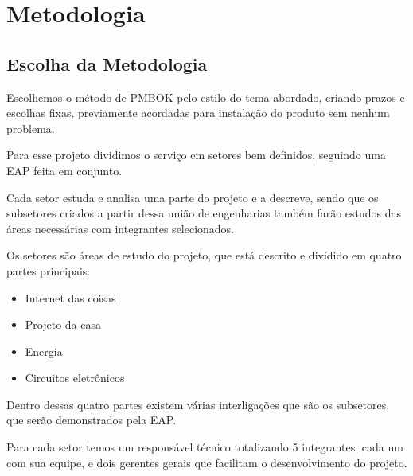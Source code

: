 \chapter{Metodologia}
    \section{Escolha da Metodologia}
        \par Escolhemos o método de PMBOK pelo estilo do tema abordado, criando prazos e escolhas fixas, previamente acordadas para instalação do produto sem nenhum problema.
        \par Para esse projeto dividimos o serviço em setores bem definidos, seguindo uma EAP feita em conjunto.  
        \par Cada setor estuda e analisa uma parte do projeto e a descreve, sendo que os subsetores criados a partir dessa união de engenharias também farão estudos das áreas necessárias com integrantes selecionados.
        \par Os setores são áreas de estudo do projeto,  que está descrito e dividido em quatro partes principais:
        \begin{itemize}
            \item Internet das coisas
            \item Projeto da casa
            \item Energia
            \item Circuitos eletrônicos
        \end{itemize}
        \par Dentro dessas quatro partes existem várias interligações que são os subsetores, que serão demonstrados pela EAP.
    	\par Para cada setor temos um responsável técnico totalizando 5 integrantes, cada um com sua equipe, e dois gerentes gerais que facilitam o desenvolvimento do projeto.
    
